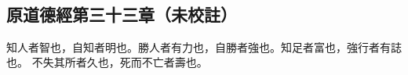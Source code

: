 ﻿%
%

\chapter{~}

\section{原道德經第三十三章（未校註）}

\begin{withgezhu}

\zhsong


知人者智也，自知者明也。勝人者有力也，自勝者強也。知足者富也，強行者有誌也。
不失其所者久也，\textcolor{tongjia-color}{死而不}\textcolor{tongjia-color}{亡者壽也}。

\end{withgezhu}
